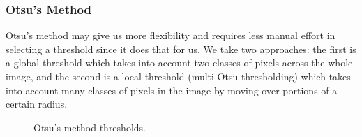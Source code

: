 \documentclass[]{article}
\begin{document}
\subsubsection*{Otsu's Method}
Otsu's method may give us more flexibility and requires less manual effort in selecting a threshold since it does that for us. We take two approaches: the first is a global threshold which takes into account two classes of pixels across the whole image, and the second is a local threshold (multi-Otsu thresholding) which takes into account many classes of pixels in the image by moving over portions of a certain radius. 
\begin{figure}[h]
\centering
{}
\caption{Otsu's method thresholds.}
\end{figure}
\end{document}
